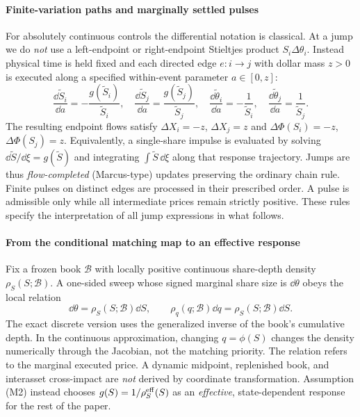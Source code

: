 \documentclass[review,hidelinks,onefignum,onetabnum]{siamonline250211}
\begin{document}
\paragraph{Finite-variation paths and marginally settled pulses}
For absolutely continuous controls the differential notation is classical. At a jump we do \emph{not} use a left-endpoint or right-endpoint Stieltjes product $S_i\Delta\theta_i$. Instead physical time is held fixed and each directed edge $e:i\to j$ with dollar mass $z>0$ is executed along a specified within-event parameter $a\in[0,z]$:
\begin{equation}\label{eq:pulse-flow}
\frac{\dd \widetilde S_i}{\dd a}=-\frac{g(\widetilde S_i)}{\widetilde S_i},\quad
\frac{\dd \widetilde S_j}{\dd a}=\frac{g(\widetilde S_j)}{\widetilde S_j},\quad
\frac{\dd\widetilde\theta_i}{\dd a}=-\frac{1}{\widetilde S_i},\quad
\frac{\dd\widetilde\theta_j}{\dd a}=\frac{1}{\widetilde S_j}.
\end{equation}
The resulting endpoint flows satisfy $\Delta X_i=-z$, $\Delta X_j=z$ and $\Delta\Phi(S_i)=-z$, $\Delta\Phi(S_j)=z$. Equivalently, a single-share impulse is evaluated by solving $\dd\widetilde S/\dd\xi=g(\widetilde S)$ and integrating $\int\widetilde S\,\dd\xi$ along that response trajectory. Jumps are thus \emph{flow-completed} (Marcus-type) updates preserving the ordinary chain rule. Finite pulses on distinct edges are processed in their prescribed order. A pulse is admissible only while all intermediate prices remain strictly positive. These rules specify the interpretation of all jump expressions in what follows.

\paragraph{From the conditional matching map to an effective response} Fix a frozen book $\mathcal B$ with locally positive continuous share-depth density $\rho_S(S;\mathcal B)$. A one-sided sweep whose signed marginal share size is $\dd\theta$ obeys the local relation
\begin{equation}\label{eq:frozen-depth}
\dd\theta=\rho_S(S;\mathcal B)\dd S,
\qquad \rho_q(q;\mathcal B)\dd q=\rho_S(S;\mathcal B)\dd S.
\end{equation}
The exact discrete version uses the generalized inverse of the book's cumulative depth. In the continuous approximation, changing $q=\phi(S)$ changes the density numerically through the Jacobian, not the matching priority. The relation refers to the marginal executed price. A dynamic midpoint, replenished book, and interasset cross-impact are \emph{not} derived by coordinate transformation. Assumption (M2) instead chooses $g(S)=1/\rho_S^{\rm eff}(S)$ as an \emph{effective}, state-dependent response for the rest of the paper.
\end{document}
